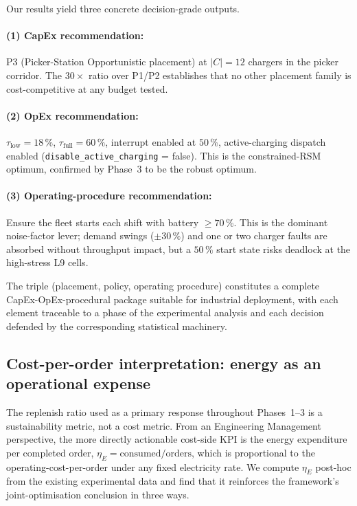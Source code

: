 \documentclass[conference]{IEEEtran}
\begin{document}
Our results yield three concrete decision-grade outputs.

\paragraph{(1) CapEx recommendation:} P3 (Picker-Station Opportunistic placement) at $|C|=12$ chargers in the picker corridor. The $30{\times}$ ratio over P1/P2 establishes that no other placement family is cost-competitive at any budget tested.

\paragraph{(2) OpEx recommendation:} $\tau_\text{low} = 18\,\%$, $\tau_\text{full} = 60\,\%$, interrupt enabled at $50\,\%$, active-charging dispatch enabled (\texttt{disable\_active\_charging} = false). This is the constrained-RSM optimum, confirmed by Phase~3 to be the robust optimum.

\paragraph{(3) Operating-procedure recommendation:} Ensure the fleet starts each shift with battery $\geq 70\,\%$. This is the dominant noise-factor lever; demand swings ($\pm 30\,\%$) and one or two charger faults are absorbed without throughput impact, but a $50\,\%$ start state risks deadlock at the high-stress L9 cells.

The triple (placement, policy, operating procedure) constitutes a complete CapEx-OpEx-procedural package suitable for industrial deployment, with each element traceable to a phase of the experimental analysis and each decision defended by the corresponding statistical machinery.

\subsection{Cost-per-order interpretation: energy as an operational expense}
\label{sec:cost_per_order}

The replenish ratio used as a primary response throughout Phases~1--3 is a sustainability metric, not a cost metric. From an Engineering Management perspective, the more directly actionable cost-side KPI is the energy expenditure per completed order, $\eta_E = \text{consumed} / \text{orders}$, which is proportional to the operating-cost-per-order under any fixed electricity rate. We compute $\eta_E$ post-hoc from the existing experimental data and find that it reinforces the framework's joint-optimisation conclusion in three ways.
\end{document}

